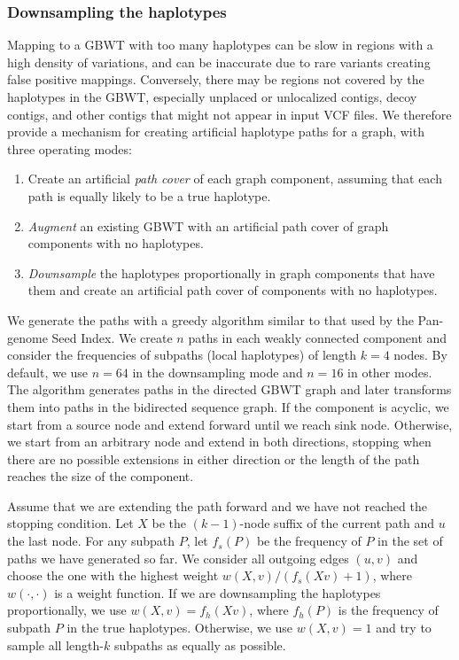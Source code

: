 \documentclass[11pt]{ucscthesis}
\newcommand{\vocab}[1]{\emph{#1}}
\begin{document}
\subsubsection{Downsampling the haplotypes}
\label{subsec:aim2:downsampling}

Mapping to a GBWT with too many haplotypes can be slow in regions with a high density of variations, and can be inaccurate due to rare variants creating false positive mappings.
Conversely, there may be regions not covered by the haplotypes in the GBWT, especially unplaced or unlocalized contigs, decoy contigs, and other contigs that might not appear in input VCF files.
We therefore provide a mechanism for creating artificial haplotype paths for a graph, with three operating modes:
\begin{enumerate}
    \item Create an artificial \vocab{path cover} of each graph component, assuming that each path is equally likely to be a true haplotype.
    \item \vocab{Augment} an existing GBWT with an artificial path cover of graph components with no haplotypes.
    \item \vocab{Downsample} the haplotypes proportionally in graph components that have them and create an artificial path cover of components with no haplotypes.
\end{enumerate}

We generate the paths with a greedy algorithm similar to that used by the Pan-genome Seed Index\cite{Ghaffaari2019}.
We create $n$ paths in each weakly connected component and consider the frequencies of subpaths (local haplotypes) of length $k = 4$ nodes.
By default, we use $n = 64$ in the downsampling mode and $n = 16$ in other modes.
The algorithm generates paths in the directed GBWT graph and later transforms them into paths in the bidirected sequence graph.
If the component is acyclic, we start from a source node and extend forward until we reach sink node.
Otherwise, we start from an arbitrary node and extend in both directions, stopping when there are no possible extensions in either direction or the length of the path reaches the size of the component.

Assume that we are extending the path forward and we have not reached the stopping condition.
Let $X$ be the $(k-1)$-node suffix of the current path and $u$ the last node.
For any subpath $P$, let $f_{s}(P)$ be the frequency of $P$ in the set of paths we have generated so far.
We consider all outgoing edges $(u, v)$ and choose the one with the highest weight $w(X, v) / (f_{s}(Xv) + 1)$, where $w(\cdot, \cdot)$ is a weight function.
If we are downsampling the haplotypes proportionally, we use $w(X, v) = f_{h}(Xv)$, where $f_{h}(P)$ is the frequency of subpath $P$ in the true haplotypes.
Otherwise, we use $w(X, v) = 1$ and try to sample all length-$k$ subpaths as equally as possible.
\end{document}
